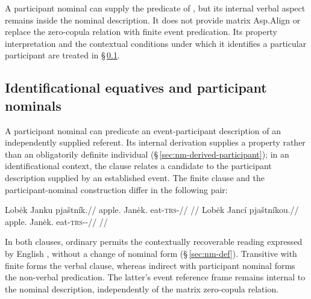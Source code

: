 A participant nominal can supply the predicate of , but its
internal verbal aspect remains inside the nominal description. It does not
provide matrix Asp.Align or replace the zero-copula relation with finite
event predication. Its property interpretation and the contextual conditions
under which it identifies a particular participant are treated in
§\,\ref{sec:ident-equative}.

\subsection{Identificational equatives and participant nominals}%
\label{sec:ident-equative}\label{sec:nmlz-predicative}

A participant nominal can predicate an event-participant description of an
independently supplied referent. Its internal derivation supplies a property
rather than an obligatorily definite individual
(§\,\ref{sec:nm-derived-participant}); in an identificational context,
the clause relates a candidate to the participant description supplied by an
established event. The finite clause and the participant-nominal
construction differ in the following pair:

\pex
\a
\begingl
\gla Lobėk Janku pjaštník.//
\glb apple.\Dir{} Janėk.\Trs{} eat-\textsc{trs}-\Pf{}//
\glft {} //
\endgl
\a
\begingl
\gla Lobėk Jancí pjaštníkou.//
\glb apple.\Dir{} Janėk.\Ind{} eat-\textsc{trs}-\Pf{}-\Nmlz{}//
\glft {} //
\endgl
\xe

\noindent In both clauses, ordinary  permits the contextually
recoverable reading expressed by English , without a change
of nominal form (§\,\ref{sec:nm-def}). Transitive  with finite
 forms the verbal clause, whereas indirect 
with participant nominal  forms the non-verbal
predication. The latter's event reference frame remains internal to the
nominal description, independently of the matrix zero-copula relation.

